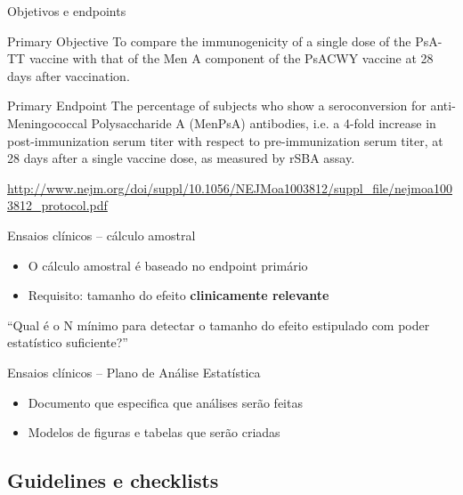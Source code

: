 \documentclass{beamer}
\begin{document}
\begin{frame}{Objetivos e endpoints}
  \begin{exampleblock}{Primary Objective}
    \footnotesize
    To compare the immunogenicity of a single dose of the PsA-TT vaccine with that of the Men A component of the PsACWY vaccine at 28 days after vaccination. 
\end{exampleblock}

\begin{exampleblock}{Primary Endpoint}
  \footnotesize
  The percentage of subjects who show a seroconversion for anti-Meningococcal Polysaccharide A (MenPsA) antibodies, i.e. a \alert<2>{4-fold increase} in post-immunization serum titer with respect to pre-immunization serum titer, at 28 days after a single vaccine dose, as measured by rSBA assay. 
\end{exampleblock}
\vfill
\tiny
 \url{http://www.nejm.org/doi/suppl/10.1056/NEJMoa1003812/suppl_file/nejmoa1003812_protocol.pdf}
\end{frame}

\begin{frame}{Ensaios clínicos -- cálculo amostral}
  \begin{itemize}
    \footnotesize
  \item O cálculo amostral é baseado no endpoint primário
    \bigskip
  \item Requisito: tamanho do efeito {\bf clinicamente relevante}
  \end{itemize}
  \bigskip
  \bigskip
  \bigskip
  \begin{block}{}
    ``Qual é o N mínimo para detectar o tamanho do efeito estipulado com poder estatístico suficiente?''
  \end{block}
\end{frame}

\begin{frame}{Ensaios clínicos -- Plano de Análise Estatística}
  \begin{itemize}
    \footnotesize
  \item Documento que especifica que análises serão feitas
    \bigskip
  \item Modelos de figuras e tabelas que serão criadas
  \end{itemize}
\end{frame}

\subsection{Guidelines e checklists}
\end{document}
